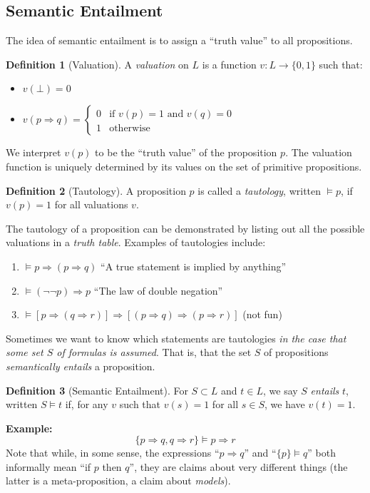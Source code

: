 \documentclass{article}
\theoremstyle{definition}
\newtheorem{definition}{Definition}
\numberwithin{definition}{section}
\newcommand{\entails}{\models}
\begin{document}
\subsection{Semantic Entailment}
The idea of semantic entailment is to assign a ``truth value'' to all propositions. 
\begin{definition}[Valuation]
A \textit{valuation} on $L$ is a function $v: L \to \{0,1\}$ such that:
\begin{itemize}
\item $v(\bot) = 0$
\item $v(p \Rightarrow q) = \begin{cases} 0 & \text{if $v(p)=1$ and $v(q) = 0$} \\ 1 & \text{otherwise}\end{cases}$
\end{itemize}
\end{definition}
We interpret $v(p)$ to be the ``truth value'' of the proposition $p$. The valuation function is uniquely determined by its values on the set of primitive propositions. 
\begin{definition}[Tautology]
A proposition $p$ is called a \textit{tautology}, written $\entails p$, if $v(p)=1$ for all valuations $v$. 
\end{definition}
The tautology of a proposition can be demonstrated by listing out all the possible valuations in a \textit{truth table}. Examples of tautologies include:
\begin{enumerate}[i]
\item $\entails p \Rightarrow (p \Rightarrow q)$ ``A true statement is implied by anything''
\item $\entails (\neg \neg p) \Rightarrow p$ ``The law of double negation''
\item $\entails \left[p \Rightarrow (q \Rightarrow r)\right] \Rightarrow \left[(p \Rightarrow q) \Rightarrow (p \Rightarrow r) \right]$ (not fun)
\end{enumerate}

Sometimes we want to know which statements are tautologies \textit{in the case that some set $S$ of formulas is assumed}. That is, that the set $S$ of propositions \textit{semantically entails} a proposition.

\begin{definition}[Semantic Entailment]
For $S \subset L$ and $t \in L$, we say $S$ \textit{entails} $t$, written $S \entails t$ if, for any $v$ such that $v(s)=1$ for all $s \in S$, we have $v(t)=1$. 
\end{definition}
\textbf{Example:} 
$$\{p \Rightarrow q, q \Rightarrow r\} \entails p \Rightarrow r$$
Note that while, in some sense, the expressions ``$p \Rightarrow q$'' and ``$\{p\} \entails q$'' both informally mean ``if $p$ then $q$'', they are claims about very different things (the latter is a meta-proposition, a claim about \textit{models}).  
\end{document}
